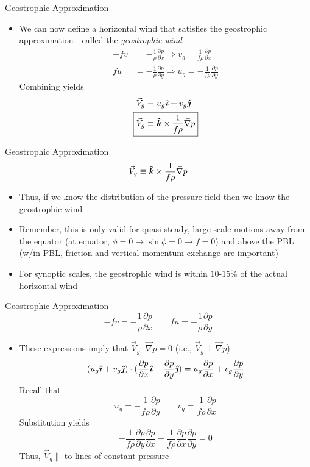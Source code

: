 \begin{frame}{Geostrophic Approximation}

\begin{itemize}
	\item We can now define a horizontal wind that satisfies the geostrophic approximation - called the \textit{geostrophic wind}
	\begin{align*}
	-f v &= -\frac{1}{\rho}\frac{\partial p}{\partial x} \Rightarrow v_g = \frac{1}{f\rho}\frac{\partial p}{\partial x}\\
	f u &= -\frac{1}{\rho}\frac{\partial p}{\partial y} \Rightarrow u_g = -\frac{1}{f\rho}\frac{\partial p}{\partial y}	
	\end{align*}
	Combining yields
	\begin{align*}
	\vec{V}_g &\equiv u_g \ihat + v_g \jhat\\
	\Aboxed{\vec{V}_g &\equiv \khat \times \frac{1}{f \rho}\vec{\nabla}{p}}
	\end{align*}
\end{itemize}
\end{frame}
\begin{frame}{Geostrophic Approximation}
$$\vec{V}_g \equiv \boldsymbol{\hat{k}} \times \frac{1}{f \rho}\vec{\nabla}{p}$$
\begin{itemize}
	\item Thus, if we know the distribution of the pressure field then we know the geostrophic wind
	\item Remember, this is only valid for quasi-steady, large-scale motions away from the equator (at equator, $\phi=0\rightarrow\sin\phi=0\rightarrow f=0$) and above the PBL (w/in PBL, friction and vertical momentum exchange are important)
	\item For synoptic scales, the geostrophic wind is within $10$-$15\%$ of the actual horizontal wind
\end{itemize}
\end{frame}

\begin{frame}{Geostrophic Approximation}
$$-f v = -\frac{1}{\rho}\frac{\partial p}{\partial x}\qquad f u = -\frac{1}{\rho}\frac{\partial p}{\partial y}$$
\begin{itemize}
	\item These expressions imply that $\vec{V}_g \cdot \vec{\nabla}p = 0$ (i.e., $\vec{V}_g \perp \vec{\nabla}p$)
	$$(u_g \boldsymbol{\hat{\imath}} + v_g \boldsymbol{\hat{\jmath}})\cdot(\frac{\partial p}{\partial x}\boldsymbol{\hat{\imath}} + \frac{\partial p}{\partial y}\boldsymbol{\hat{\jmath}}) = u_g\frac{\partial p}{\partial x}+ v_g\frac{\partial p}{\partial y}$$
	Recall that 
	$$u_g = -\frac{1}{f\rho}\frac{\partial p}{\partial y}\qquad v_g = \frac{1}{f\rho}\frac{\partial p}{\partial x}$$
	Substitution yields
	$$-\frac{1}{f\rho}\frac{\partial p}{\partial y}\frac{\partial p}{\partial x} + \frac{1}{f\rho}\frac{\partial p}{\partial x}\frac{\partial p}{\partial y} = 0$$
	Thus, $\vec{V}_g \parallel $ to lines of constant pressure
\end{itemize}
\end{frame}

